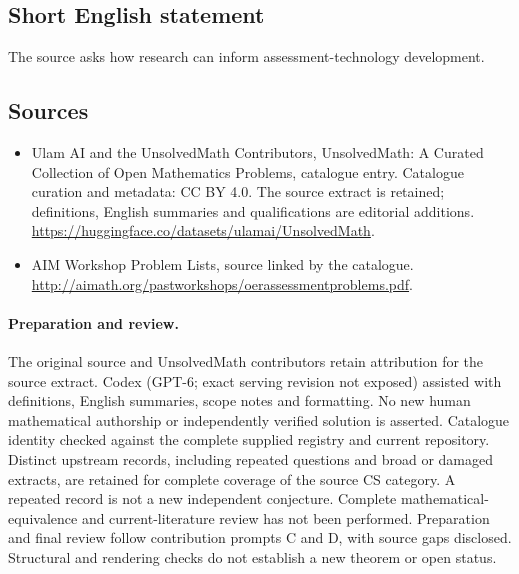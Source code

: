 \documentclass[11pt]{article}
\begin{document}
\subsection{Short English statement}
The source asks how research can inform assessment-technology development.
\subsection{Sources}
\begin{itemize}
\item[\hypertarget{source:statement:1}{S1}] Ulam AI and the UnsolvedMath Contributors, UnsolvedMath: A Curated Collection of Open Mathematics Problems, catalogue entry. Catalogue curation and metadata: CC BY 4.0. The source extract is retained; definitions, English summaries and qualifications are editorial additions.
\url{https://huggingface.co/datasets/ulamai/UnsolvedMath}.
\item[\hypertarget{source:statement:2}{S2}] AIM Workshop Problem Lists, source linked by the catalogue.
\url{http://aimath.org/pastworkshops/oerassessmentproblems.pdf}.
\end{itemize}
\paragraph{Preparation and review.}
The original source and UnsolvedMath contributors retain attribution for the source extract. Codex (GPT-6; exact serving revision not exposed) assisted with definitions, English summaries, scope notes and formatting. No new human mathematical authorship or independently verified solution is asserted. Catalogue identity checked against the complete supplied registry and current repository. Distinct upstream records, including repeated questions and broad or damaged extracts, are retained for complete coverage of the source CS category. A repeated record is not a new independent conjecture. Complete mathematical-equivalence and current-literature review has not been performed. Preparation and final review follow contribution prompts C and D, with source gaps disclosed. Structural and rendering checks do not establish a new theorem or open status.
\label{end:statement}
\end{document}
